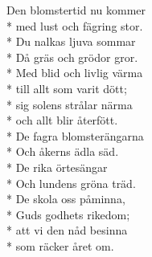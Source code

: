 \begin{SongText}
    \begin{SongVerse}
        Den blomstertid nu kommer\\*%
        med lust och fägring stor.\\*%
        Du nalkas ljuva sommar\\*%
        Då gräs och grödor gror.\\*%
        Med blid och livlig värma\\*%
        till allt som varit dött;\\*%
        sig solens strålar närma\\*%
        och allt blir återfött. \\*%
        De fagra blomsterängarna\\*%
        Och åkerns ädla säd.\\*%
        De rika örtesängar\\*%
        Och lundens gröna träd.\\*%
        De skola oss påminna,\\*%
        Guds godhets rikedom;\\*%
        att vi den nåd besinna\\*%
        som räcker året om.
    \end{SongVerse}
\end{SongText}
